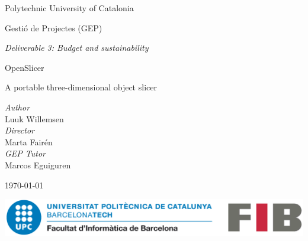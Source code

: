 
\center 

\Large
Polytechnic University of Catalonia

\vspace{.5cm}
\large
Gestió de Projectes (GEP)

\textit{Deliverable 3: Budget and sustainability}

\roboto
\vspace*{1cm}
\HUGE
\textcolor{title-red}{OpenSlicer}

\vspace{0.5cm}

\LARGE
A portable three-dimensional object slicer

\vspace{1cm}


\normalsize \textit{Author} \\ \large{Luuk Willemsen} \\ \vspace{0.5cm}
\normalsize \textit{Director} \\ \large{Marta Fairén} \\ \vspace{0.5cm}
\normalsize \textit{GEP Tutor} \\ \large{Marcos Eguiguren}


\vspace{1cm}

\normalsize
\today

\vspace{1cm}


\includegraphics[width=1\textwidth]{images/fib-upc.png}